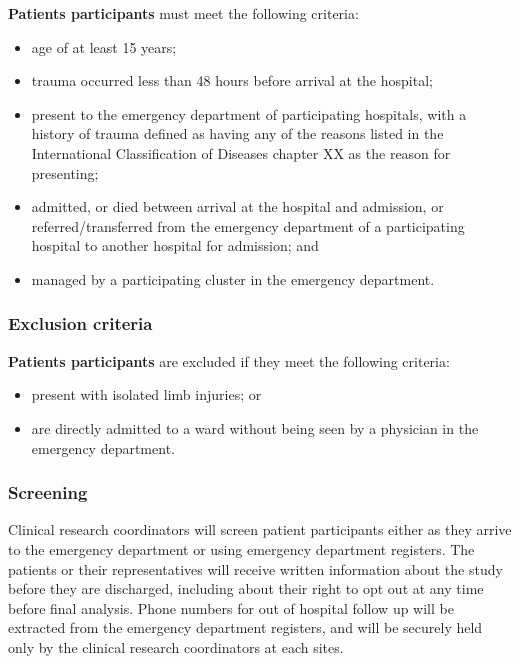 \documentclass[
]{scrartcl}
\providecommand{\tightlist}{%
  \setlength{\itemsep}{0pt}\setlength{\parskip}{0pt}}\usepackage{longtable,booktabs,array}
\begin{document}
\textbf{Patients participants} must meet the following criteria:

\begin{itemize}
\tightlist
\item
  age of at least 15 years;
\item
  trauma occurred less than 48 hours before arrival at the hospital;
\item
  present to the emergency department of participating hospitals, with a
  history of trauma defined as having any of the reasons listed in the
  International Classification of Diseases chapter XX as the reason for
  presenting;
\item
  admitted, or died between arrival at the hospital and admission, or
  referred/transferred from the emergency department of a participating
  hospital to another hospital for admission; and
\item
  managed by a participating cluster in the emergency department.
\end{itemize}

\hypertarget{exclusion-criteria-1}{%
\subsubsection{Exclusion criteria}\label{exclusion-criteria-1}}

\textbf{Patients participants} are excluded if they meet the following
criteria:

\begin{itemize}
\tightlist
\item
  present with isolated limb injuries; or
\item
  are directly admitted to a ward without being seen by a physician in
  the emergency department.
\end{itemize}

\hypertarget{screening-2}{%
\subsubsection{Screening}\label{screening-2}}

Clinical research coordinators will screen patient participants either
as they arrive to the emergency department or using emergency department
registers. The patients or their representatives will receive written
information about the study before they are discharged, including about
their right to opt out at any time before final analysis. Phone numbers
for out of hospital follow up will be extracted from the emergency
department registers, and will be securely held only by the clinical
research coordinators at each sites.
\end{document}
